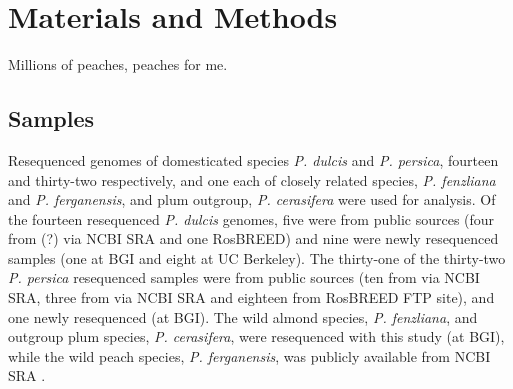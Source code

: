 \documentclass[12pt]{article}
\begin{document}


\section*{Materials and Methods}
Millions of peaches, peaches for me.

\subsection*{Samples}
Resequenced genomes of domesticated species \emph{P. dulcis} and \emph{P. persica}, fourteen and thirty-two respectively, and one each of closely related species, \emph{P. fenzliana} and \emph{P. ferganensis}, and plum outgroup, \emph{P. cerasifera} were used for analysis. 
Of the fourteen resequenced \emph{P. dulcis} genomes, five were from public sources (four from \citealt{koepke2013comparative}(?) via NCBI SRA and one RosBREED) and nine were newly resequenced samples (one at BGI and eight at UC Berkeley). 
The thirty-one of the thirty-two \emph{P. persica} resequenced samples were from public sources (ten from \citealt{verde2013high} via NCBI SRA, three from \citealt{ahmad2011whole} via NCBI SRA and eighteen from RosBREED FTP site), and one newly resequenced (at BGI). 
The wild almond species, \emph{P. fenzliana}, and outgroup plum species, \emph{P. cerasifera}, were resequenced with this study (at BGI), while the wild peach species, \emph{P. ferganensis}, was publicly available from NCBI SRA \citep{verde2013high}.\\

\end{document}
